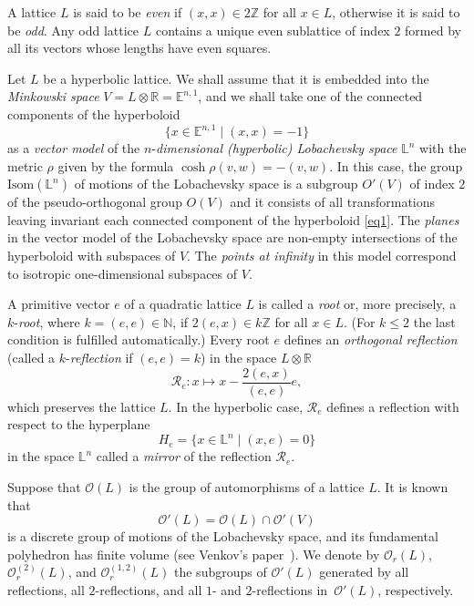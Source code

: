 \documentclass[reqno,12pt]{amsart}
\begin{document}
A lattice $L$ is said to be \textit{even} if $(x,x) \in 2 \mathbb{Z}$ for all $x \in L$,
otherwise it is said to be \textit{odd}. Any odd lattice $L$ contains a unique even sublattice
of index $2$ formed by all its vectors whose lengths have even squares.


Let $L$ be a hyperbolic lattice. We shall assume that it is embedded into the
\textit{Minkowski space} $V=L \otimes \mathbb{R}=\mathbb{E}^{n, 1}$,
and we shall take one of the connected components of the hyperboloid
\begin{equation}
\label{eq1}
\{x \in \mathbb{E}^{n, 1}\mid (x, x)=-1\}
\end{equation}
as a \textit{vector model} of the $n$-\textit{dimensional (hyperbolic) Lobachevsky space} $\mathbb{L}^n$
with the metric $\rho$ given by the formula $\cosh\rho(v,w)= -(v,w)$.
In this case, the group $\mathrm{Isom}(\mathbb{L}^n)$ of
motions of the Lobachevsky space is a subgroup $O'(V)$ of index $2$ of the pseudo-orthogonal group $O(V)$ and
it consists of all
transformations leaving invariant each connected component of the hyperboloid \eqref{eq1}.
The \textit{planes} in the vector model of the Lobachevsky space are non-empty
intersections of the hyperboloid with subspaces of $V$. The \textit{points at infinity} in this
model correspond to isotropic one-dimensional subspaces of $V$.


A primitive vector $e$ of a quadratic lattice $L$ is
called a \textit{root} or, more precisely, a
$k$-\textit{root}, where $k=(e,e) \in \mathbb{N}$, if $2(e, x) \in
k\mathbb{Z}$ for all $x \in L$. (For $k \leqslant 2$ the last condition is fulfilled automatically.)
Every root $e$ defines an \textit{orthogonal reflection} (called a $k$-\textit{reflection} if $(e,e)=k$)
in the space
$L \otimes \mathbb{R}$
$$
\mathcal{R}_e\colon x \mapsto x-\frac{2(e, x)}{(e, e)} e,
$$
which preserves the lattice $L$. In the hyperbolic case, $\mathcal{R}_e$ defines a reflection with respect to
the hyperplane
$$
H_e=\{x \in \mathbb{L}^n \mid (x, e)=0\}
$$
in the space $\mathbb{L}^n$ called a \textit{mirror} of the reflection $\mathcal{R}_e$.

Suppose that $\mathcal{O}(L)$ is the group of automorphisms of a lattice $L$. It is known that
$$
\mathcal{O}'(L)=\mathcal{O}(L) \cap \mathcal{O}'(V)
$$
is a discrete group of motions of the Lobachevsky space, and
its fundamental polyhedron has finite volume (see Venkov's paper~\cite{Ven37}). We denote by $\mathcal{O}_r(L)$,
$\mathcal{O}^{(2)}_r(L)$, and $\mathcal{O}^{(1{,}2)}_r(L)$ the subgroups of
$\mathcal{O}'(L)$ generated by all
reflections, all  $2$-reflections, and all  $1$- and $2$-reflections in~$\mathcal{O}'(L)$, respectively.
\end{document}
